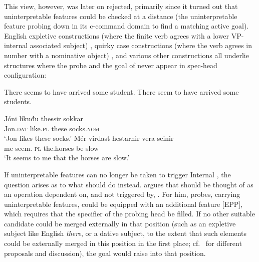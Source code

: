 \documentclass[output=paper]{langsci/langscibook}
\begin{document}
\ea\label{ex:key:26.1}
\z

This view, however, was later on rejected, primarily since it turned out that
uninterpretable features could be checked at a distance (the uninterpretable
feature probing down in its c-command domain to find a matching active goal).
English expletive constructions (where the finite verb agrees with a lower
VP-internal associated subject) ,  quirky case
constructions (where the verb agrees in number with a nominative object)
, and various other constructions all underlie structures
where the probe and the goal of  never appear in spec-head
configuration:

\ea\label{ex:key:26.2}
    \ea There seems to have arrived some student.
    \ex There seem to have arrived some students.
    \z
\z

\ea\label{ex:key:26.3}  \parencite{Bobaljik2008} %
    \ea
    \gll    Jóni líkuđu thessir sokkar\\
            Jon.\textsc{dat} like.\textsc{pl} these socks.\textsc{nom}\\
    \glt    \enquote*{Jon likes these socks.}
    \ex
    \gll    Mér virdast hestarnir vera seinir\\
            me seem. \textsc{pl} the.horses be slow\\
    \glt    \enquote*{It seems to me that the horses are slow.}\\
    \z
\z

If uninterpretable features can no longer be taken to trigger Internal
, the question arises as to what should do instead.
\textcite{Chomsky2000,Chomsky2001} argues that  should be thought of as
an operation dependent on, and not triggered by, . For him, probes,
carrying uninterpretable features, could be equipped with an additional feature
[EPP], which requires that the specifier of the probing head be filled. If no
other suitable candidate could be merged externally in that position (such as
an expletive subject like English \emph{there}, or a dative subject, to the
extent that such elements could be externally merged in this position in the
first place; cf.\ \citealt{Chomsky2000,Deal2009} for different proposals and
discussion), the goal would raise into that position.
\end{document}

